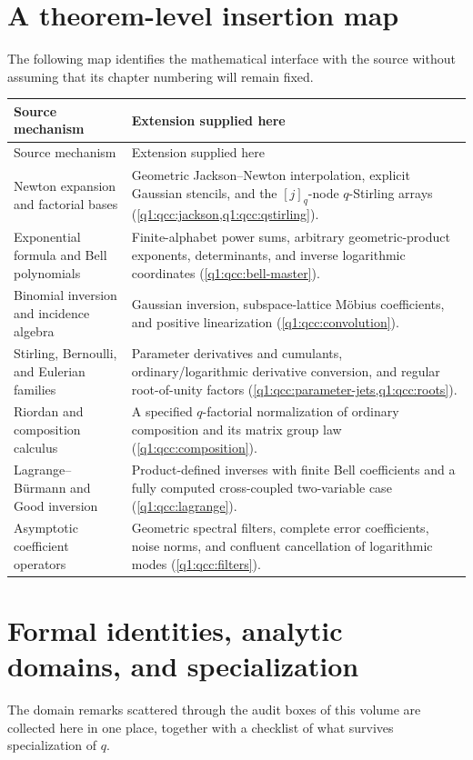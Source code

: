 \documentclass[11pt,a4paper,oneside,openany]{book}
\theoremstyle{definition}
\theoremstyle{remark}
\begin{document}
\section{A theorem-level insertion map}
The following map identifies the mathematical interface with the source without
assuming that its chapter numbering will remain fixed.
\begin{longtable}{@{}p{}p{}@{}}
\toprule
Source mechanism & Extension supplied here\\
\midrule
\endfirsthead
\toprule
Source mechanism & Extension supplied here\\
\midrule
\endhead
Newton expansion and factorial bases &
Geometric Jackson--Newton interpolation, explicit Gaussian stencils, and the
\([j]_q\)-node \(q\)-Stirling arrays
(\cref{q1:qcc:jackson,q1:qcc:qstirling}).\\[2mm]
Exponential formula and Bell polynomials &
Finite-alphabet power sums, arbitrary geometric-product exponents, determinants,
and inverse logarithmic coordinates (\cref{q1:qcc:bell-master}).\\[2mm]
Binomial inversion and incidence algebra &
Gaussian inversion, subspace-lattice M\"obius coefficients, and positive
linearization (\cref{q1:qcc:convolution}).\\[2mm]
Stirling, Bernoulli, and Eulerian families &
Parameter derivatives and cumulants, ordinary/logarithmic derivative conversion,
and regular root-of-unity factors
(\cref{q1:qcc:parameter-jets,q1:qcc:roots}).\\[2mm]
Riordan and composition calculus &
A specified \(q\)-factorial normalization of ordinary composition and its
matrix group law (\cref{q1:qcc:composition}).\\[2mm]
Lagrange--B\"urmann and Good inversion &
Product-defined inverses with finite Bell coefficients and a fully computed
cross-coupled two-variable case (\cref{q1:qcc:lagrange}).\\[2mm]
Asymptotic coefficient operators &
Geometric spectral filters, complete error coefficients, noise norms, and
confluent cancellation of logarithmic modes (\cref{q1:qcc:filters}).\\
\bottomrule
\end{longtable}

\section{Formal identities, analytic domains, and specialization}
\label{q2:sec:analytic}
The domain remarks scattered through the audit boxes of this volume are
collected here in one place, together with a checklist of what survives
specialization of \(q\).
\end{document}
